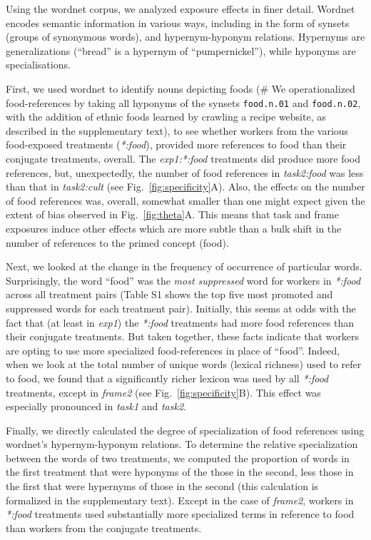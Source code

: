 \documentclass[12pt]{article}
\begin{document}
Using the wordnet corpus, we analyzed exposure effects in finer detail.
Wordnet encodes semantic information in various ways, including in the form 
of synsets (groups of synonymous words), and hypernym-hyponym relations.
Hypernyms are generalizations (``bread'' is a hypernym of ``pumpernickel''),
while hyponyms are specialisations.

First, we used wordnet to identify nouns depicting foods (\# We 
operationalized food-references by taking all hyponyms of the synsets 
\texttt{food.n.01} and \texttt{food.n.02}, with the addition of ethnic foods 
learned by crawling a recipe website, as described in the supplementary text),
to see whether 
workers from the various food-exposed treatments (\textit{*:food}), 
provided more references to food than their conjugate treatments, overall.
The \textit{exp1:*:food} treatments
did produce more food references, but, unexpectedly, 
the number of food references in \textit{task2:food} was
less than that in \textit{task2:cult} (see Fig.~\ref{fig:specificity}A). Also, the effects on the
number of food references was, overall, somewhat smaller than one might 
expect given the extent of bias observed in Fig.~\ref{fig:theta}A.  This means that task and frame exposures
induce other effects which are more subtle than a bulk shift in the number 
of references to the primed concept (food).

Next, we looked at the change in the frequency of occurrence of particular 
words.  Surprisingly, the word ``food'' was the \textit{most suppressed} word
for workers in \textit{*:food} across all treatment pairs (Table S1 shows the
top five most promoted and suppressed words for each treatment pair).
Initially, this seems at odds with the fact that (at least in \textit{exp1})
the \textit{*:food} treatments had more food references than their conjugate
treatments.  But taken together, these facts indicate that workers are opting 
to use more specialized food-references in place of ``food''.  
Indeed, when we look at the total number of unique
words (lexical richness) used to refer to food, we found that 
a significantly richer lexicon was used by all \textit{*:food} treatments,
except in \textit{frame2} (see Fig.~\ref{fig:specificity}B).  This effect 
was especially pronounced in \textit{task1} and 
\textit{task2}.

Finally, we directly calculated the degree of specialization of food 
references using wordnet's hypernym-hyponym relations.  To determine the 
relative specialization between the words of two treatments, we computed 
the proportion of words in the first treatment that were hyponyms of the 
those in the 
second, less those in the first that were hypernyms of those in the second 
(this calculation is formalized in the supplementary text).  Except in the
case of \textit{frame2}, workers in \textit{*:food} treatments used 
substantially more specialized terms in reference to food than workers 
from the conjugate treatments.
\end{document}
